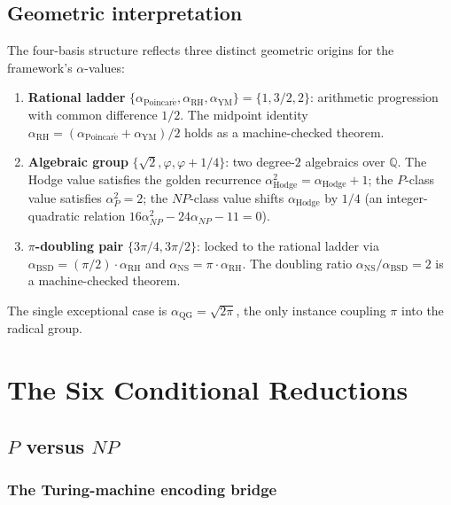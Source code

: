 \documentclass[11pt,a4paper]{article}
\theoremstyle{definition}
\theoremstyle{remark}
\begin{document}
\subsection{Geometric interpretation}

The four-basis structure reflects three distinct geometric origins
for the framework's $\alpha$-values:
\begin{enumerate}
\item \textbf{Rational ladder} $\{\alpha_{\mathrm{Poincar\acute{e}}},
\alpha_{\mathrm{RH}}, \alpha_{\mathrm{YM}}\} = \{1, 3/2, 2\}$:
arithmetic progression with common difference $1/2$. The midpoint
identity $\alpha_{\mathrm{RH}} = (\alpha_{\mathrm{Poincar\acute{e}}} +
\alpha_{\mathrm{YM}})/2$ holds as a machine-checked theorem.

\item \textbf{Algebraic group} $\{\sqrt{2}, \varphi, \varphi + 1/4\}$:
two degree-$2$ algebraics over $\mathbb{Q}$. The Hodge value satisfies
the golden recurrence $\alpha_{\mathrm{Hodge}}^2 = \alpha_{\mathrm{Hodge}} + 1$;
the $P$-class value satisfies $\alpha_P^2 = 2$; the $NP$-class value
shifts $\alpha_{\mathrm{Hodge}}$ by $1/4$ (an integer-quadratic relation
$16\alpha_{NP}^2 - 24\alpha_{NP} - 11 = 0$).

\item \textbf{$\pi$-doubling pair} $\{3\pi/4, 3\pi/2\}$: locked to the
rational ladder via $\alpha_{\mathrm{BSD}} = (\pi/2)\cdot\alpha_{\mathrm{RH}}$
and $\alpha_{\mathrm{NS}} = \pi \cdot \alpha_{\mathrm{RH}}$. The doubling
ratio $\alpha_{\mathrm{NS}}/\alpha_{\mathrm{BSD}} = 2$ is a
machine-checked theorem.
\end{enumerate}
The single exceptional case is $\alpha_{\mathrm{QG}} = \sqrt{2\pi}$, the
only instance coupling $\pi$ into the radical group.

\section{The Six Conditional Reductions}\label{sec:reductions}

\subsection{$P$ versus $NP$}

\subsubsection*{The Turing-machine encoding bridge}
\end{document}
